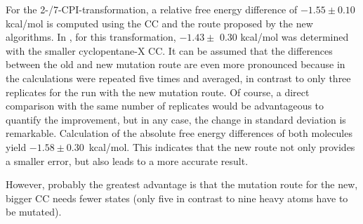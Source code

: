 For the 2-/7-CPI-transformation, a relative free energy difference of $-1.55 \pm  0.10$ kcal/mol is computed using the CC and the route proposed by the new algorithms. In \cite{Fleck.2021}, for this transformation, $-1.43  \pm $ 0.30 kcal/mol was determined with the smaller cyclopentane-X CC. It can be assumed that the differences between the old and new mutation route are even more pronounced because in \cite{Fleck.2021} the calculations were repeated five times and averaged, in contrast to only three replicates for the run with the new mutation route. 
Of course, a direct comparison with the same number of replicates would be advantageous to quantify the improvement, but in any case, the change in standard deviation is remarkable.
Calculation of the absolute free energy differences of both molecules yield $-1.58  \pm  0.30$~kcal/mol. This indicates that the new route not only provides a smaller error, but also leads to a more accurate result.

However, probably the greatest advantage is that the mutation route for the new, bigger CC needs fewer states (only five in contrast to nine heavy atoms have to be mutated). 




